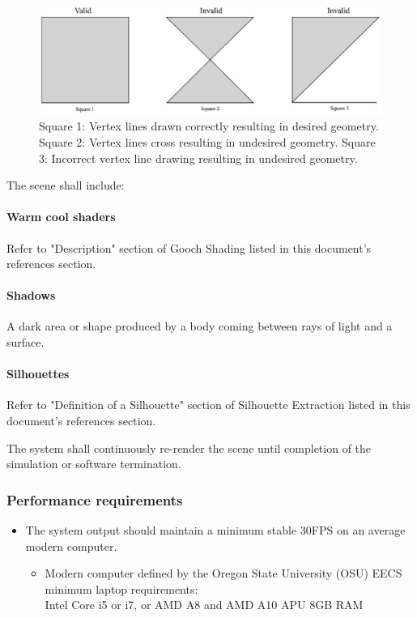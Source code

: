 \begin{flushleft}
\begin{figure} [h]
  \includegraphics[width=\linewidth]{reqdoc_v1/squares.eps}
  \caption
{ \newline \hspace{\linewidth}
Square 1: Vertex lines drawn correctly resulting in desired geometry. \newline \hspace{\linewidth}
Square 2: Vertex lines cross resulting in undesired geometry. \newline \hspace{\linewidth}
Square 3: Incorrect vertex line drawing resulting in undesired geometry.}
  \label{fig:squares}
\end{figure}

\vspace{3mm}

The scene shall include:
\paragraph{Warm cool shaders}
Refer to "Description" section of Gooch Shading listed in this document's references section.

\paragraph{Shadows}
A dark area or shape produced by a body coming between rays of light and a surface.

\paragraph{Silhouettes}
Refer to "Definition of a Silhouette" section of Silhouette Extraction listed in this document's references section.

\vspace{3mm}
The system shall continuously re-render the scene until completion of the simulation or software termination.

\subsubsection{Performance requirements}
\vspace{3mm}
\begin{itemize}
\item The system output should maintain a minimum stable 30FPS on an average modern computer.
\begin{itemize}
\item Modern computer defined by the Oregon State University (OSU) EECS minimum laptop requirements: \\
Intel Core i5 or i7, or AMD A8 and AMD A10 APU
8GB RAM


\end{itemize}
\end{itemize}
\end{flushleft}
